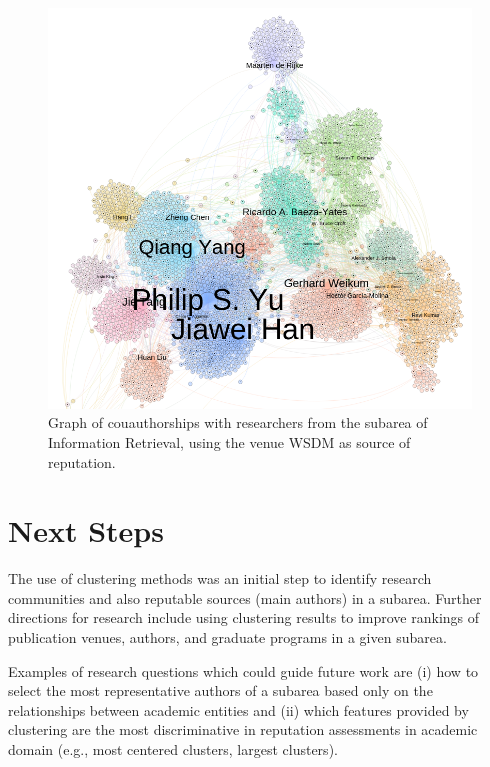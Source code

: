 \documentclass[msc]{ppgccufmg}
\begin{document}
\begin{appendices}
\begin{figure}[h]
    \centering
    \includegraphics[scale=0.45]{fig/wsdm}
    \caption{Graph of couauthorships with researchers from the subarea of Information Retrieval, using the venue WSDM as source of reputation. }
    \label{fig:wsdm}
\end{figure}


% 

\section{Next Steps}

The use of clustering methods was an initial step to identify research communities and also reputable sources (main authors) in a subarea. Further directions for research include using clustering results to improve rankings of publication venues, authors, and graduate programs in a given subarea.

Examples of research questions which could guide future work are (i) how to select the most representative authors of a subarea based only on the relationships between academic entities and (ii) which features provided by clustering are the most discriminative in reputation assessments in academic domain (e.g., most centered clusters, largest clusters).


\end{appendices}
\end{document}
